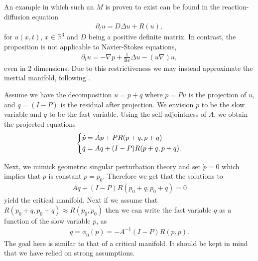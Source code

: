 An example in which such an $M$ is proven to exist can be found in the reaction-diffusion equation
\begin{align}
\partial_t u = D \Delta u + R(u),
\end{align}
for $u(x,t)$, $x\in \mathbb{R}^3$ and $D$ being a positive definite matrix. In contrast, the proposition is not applicable to Navier-Stokes equations, 
\begin{align}
\partial_t u = -\nabla p + \frac{1}{\text{Re}}\Delta u - (u\nabla)u,
\end{align}
even in 2 dimensions. Due to this restrictiveness we may instead approximate the inertial manifold, following \cite{FoiasApprox}.

Assume we have the decomposition $u=p+q$ where $p=Pu$ is the projection of $u$, and $q=(I-P)$ is the residual after projection. We envision $p$ to be the slow variable and $q$ to be the fast variable. Using the self-adjointness of $A$, we obtain the projected equations
\begin{align}
	\begin{dcases}
		\dot{p} = Ap + PR(p+q, p+q) \\
		\dot{q} = Aq + (I-P)R(p+q, p+q).
	\end{dcases}
\end{align}

Next, we mimick geometric singular perturbation theory and set $\dot{p}=0$ which implies that $p$ is constant $p=p_0$. Therefore we get that the solutions to
\begin{align}
	Aq + (I-P)R(p_0 + q, p_0 +q) =0
\end{align}
yield the critical manifold. Next if we assume that $R(p_{0}+q, p_{0}+q) \approx R(p_0, p_0)$ then we can write the fast variable $q$ as a function of the slow variable $p$, as  
\begin{align}
	q = \phi_0(p) = - A^{-1}(I-P)R(p,p).
\end{align}
The goal here is similar to that of a critical manifold. It should be kept in mind that we have relied on strong assumptions.

